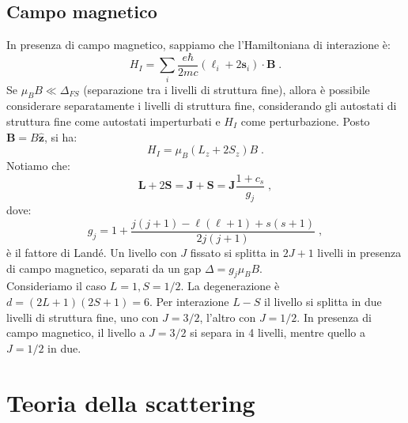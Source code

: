 \documentclass[10pt,a4paper]{report}
\theoremstyle{definition}
\numberwithin{equation}{section}
\begin{document}
\section{Campo magnetico}
In presenza di campo magnetico, sappiamo che l'Hamiltoniana di interazione è:
\begin{equation}
H_I=\sum_i \frac{e\hbar}{2mc}(\boldsymbol{\ell}_i+2\mathbf{s}_i)\cdot\mathbf{B}\;.
\end{equation}
Se $\mu_BB\ll\Delta_{FS}$ (separazione tra i livelli di struttura fine), allora è possibile considerare separatamente i livelli di struttura fine, considerando gli autostati di struttura fine come autostati imperturbati e $H_I$ come perturbazione. Posto $\mathbf{B}=B\hat{\mathbf{z}}$, si ha:
$$
H_I=\mu_B(L_z+2S_z)B\;.
$$
Notiamo che:
\begin{equation}
\mathbf{L}+2\mathbf{S}=\mathbf{J}+\mathbf{S}=\mathbf{J}\frac{1+c_s}{g_j}\;,
\end{equation}
dove:
\begin{equation}
g_j=1+\frac{j(j+1)-\ell(\ell+1)+s(s+1)}{2j(j+1)}\;,
\end{equation}
è il fattore di Landé. Un livello con $J$ fissato si splitta in $2J+1$ livelli in presenza di campo magnetico, separati da un gap $\Delta=g_j\mu_BB$. \\
Consideriamo il caso $L=1,S=1/2$. La degenerazione è $d=(2L+1)(2S+1)=6$. Per interazione $L-S$ il livello si splitta in due livelli di struttura fine, uno con $J=3/2$, l'altro con $J=1/2$. In presenza di campo magnetico, il livello a $J=3/2$ si separa in 4 livelli, mentre quello a $J=1/2$ in due.
\chapter{Teoria della scattering}
\end{document}
